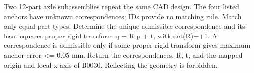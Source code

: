 Two 12-part axle subassemblies repeat the same CAD design. The four listed anchors have unknown correspondences; IDs provide no matching rule. Match only equal part types. Determine the unique admissible correspondence and its least-squares proper rigid transform q = R p + t, with det(R)=+1. A correspondence is admissible only if some proper rigid transform gives maximum anchor error <= 0.05 mm. Return the correspondences, R, t, and the mapped origin and local x-axis of B0030. Reflecting the geometry is forbidden.
